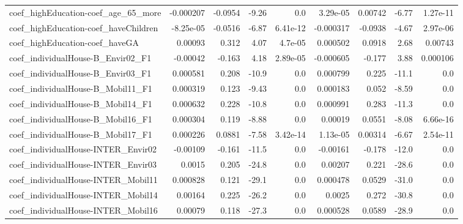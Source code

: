 \begin{tabular}{lrrrrrrrr}
coef\_highEducation-coef\_age\_65\_more       &   -0.000207 &      -0.0954 &   -9.26 &      0.0 &   3.29e-05 &     0.00742 &        -6.77 &      1.27e-11 \\
coef\_highEducation-coef\_haveChildren      &   -8.25e-05 &      -0.0516 &   -6.87 & 6.41e-12 &  -0.000317 &     -0.0938 &        -4.67 &      2.97e-06 \\
coef\_highEducation-coef\_haveGA            &     0.00093 &        0.312 &    4.07 &  4.7e-05 &   0.000502 &      0.0918 &         2.68 &       0.00743 \\
coef\_individualHouse-B\_Envir02\_F1         &    -0.00042 &       -0.163 &    4.18 & 2.89e-05 &  -0.000605 &      -0.177 &         3.88 &      0.000106 \\
coef\_individualHouse-B\_Envir03\_F1         &    0.000581 &        0.208 &   -10.9 &      0.0 &   0.000799 &       0.225 &        -11.1 &           0.0 \\
coef\_individualHouse-B\_Mobil11\_F1         &    0.000319 &        0.123 &   -9.43 &      0.0 &   0.000183 &       0.052 &        -8.59 &           0.0 \\
coef\_individualHouse-B\_Mobil14\_F1         &    0.000632 &        0.228 &   -10.8 &      0.0 &   0.000991 &       0.283 &        -11.3 &           0.0 \\
coef\_individualHouse-B\_Mobil16\_F1         &    0.000304 &        0.119 &   -8.88 &      0.0 &    0.00019 &      0.0551 &        -8.08 &      6.66e-16 \\
coef\_individualHouse-B\_Mobil17\_F1         &    0.000226 &       0.0881 &   -7.58 & 3.42e-14 &   1.13e-05 &     0.00314 &        -6.67 &      2.54e-11 \\
coef\_individualHouse-INTER\_Envir02        &    -0.00109 &       -0.161 &   -11.5 &      0.0 &   -0.00161 &      -0.178 &        -12.0 &           0.0 \\
coef\_individualHouse-INTER\_Envir03        &      0.0015 &        0.205 &   -24.8 &      0.0 &    0.00207 &       0.221 &        -28.6 &           0.0 \\
coef\_individualHouse-INTER\_Mobil11        &    0.000828 &        0.121 &   -29.1 &      0.0 &   0.000478 &      0.0529 &        -31.0 &           0.0 \\
coef\_individualHouse-INTER\_Mobil14        &     0.00164 &        0.225 &   -26.2 &      0.0 &     0.0025 &       0.272 &        -30.8 &           0.0 \\
coef\_individualHouse-INTER\_Mobil16        &     0.00079 &        0.118 &   -27.3 &      0.0 &   0.000528 &      0.0589 &        -28.9 &           0.0 \\

\end{tabular}
